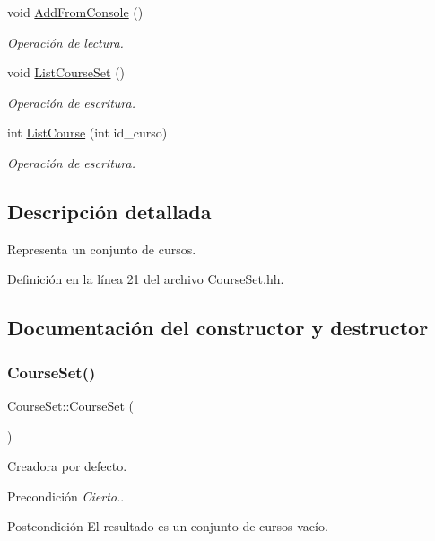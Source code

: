 \begin{DoxyCompactItemize}
void \mbox{\hyperlink{class_course_set_aee9d2b96c43a828049e02205736a4982}{Add\+From\+Console}} ()
\begin{DoxyCompactList}\small\item\em Operación de lectura. \end{DoxyCompactList}\item 
void \mbox{\hyperlink{class_course_set_a31726d4dcdefc4a218f9e1466fd2ef38}{List\+Course\+Set}} ()
\begin{DoxyCompactList}\small\item\em Operación de escritura. \end{DoxyCompactList}\item 
int \mbox{\hyperlink{class_course_set_aee3609cbaa62ae2be155754613d484e3}{List\+Course}} (int id\+\_\+curso)
\begin{DoxyCompactList}\small\item\em Operación de escritura. \end{DoxyCompactList}\end{DoxyCompactItemize}


\subsection{Descripción detallada}
Representa un conjunto de cursos. 

Definición en la línea 21 del archivo Course\+Set.\+hh.



\subsection{Documentación del constructor y destructor}
\mbox{\label{class_course_set_ae0b73bd2e6bda115838ba65644e015bc}} 
\subsubsection{\texorpdfstring{Course\+Set()}{CourseSet()}}
{\footnotesize\ttfamily Course\+Set\+::\+Course\+Set (\begin{DoxyParamCaption}{ }\end{DoxyParamCaption})}



Creadora por defecto. 

\begin{DoxyPrecond}{Precondición}
{\itshape Cierto.}. 
\end{DoxyPrecond}
\begin{DoxyPostcond}{Postcondición}
El resultado es un conjunto de cursos vacío. 
\end{DoxyPostcond}


